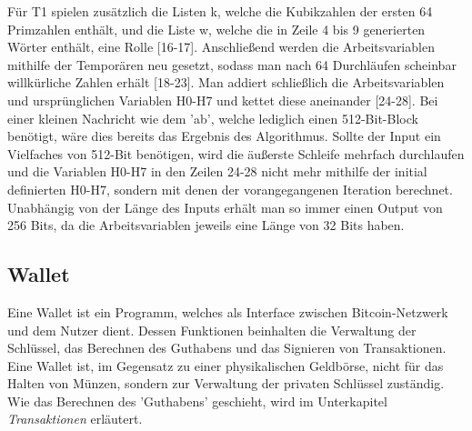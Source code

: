 Für T1 spielen zusätzlich die Listen k, welche die Kubikzahlen der ersten 64 Primzahlen enthält, und die Liste w, welche die in Zeile 4 bis 9 generierten Wörter enthält, eine Rolle [16-17].
Anschließend werden die Arbeitsvariablen mithilfe der Temporären neu gesetzt, sodass man nach 64 Durchläufen scheinbar willkürliche Zahlen erhält [18-23].
Man addiert schließlich die Arbeitsvariablen und ursprünglichen Variablen H0-H7 und kettet diese aneinander [24-28]. Bei einer kleinen Nachricht wie dem 'ab', welche lediglich einen 512-Bit-Block benötigt, wäre dies bereits das Ergebnis des Algorithmus. Sollte der Input ein Vielfaches von 512-Bit benötigen, wird die äußerste Schleife mehrfach durchlaufen und die Variablen H0-H7 in den Zeilen 24-28 nicht mehr mithilfe der initial definierten H0-H7, sondern mit denen der vorangegangenen Iteration berechnet.
Unabhängig von der Länge des Inputs erhält man so immer einen Output von 256 Bits, da die Arbeitsvariablen jeweils eine Länge von 32 Bits haben.

\subsection{Wallet}
Eine Wallet ist ein Programm, welches als Interface zwischen Bitcoin-Netzwerk und dem Nutzer dient. 
Dessen Funktionen beinhalten die Verwaltung der Schlüssel, das Berechnen des Guthabens und das Signieren von Transaktionen.
Eine Wallet ist, im Gegensatz zu einer physikalischen Geldbörse, nicht für das Halten von Münzen, sondern zur Verwaltung der privaten Schlüssel zuständig. 
Wie das Berechnen des 'Guthabens' geschieht, wird im Unterkapitel \emph{Transaktionen} erläutert.\\

